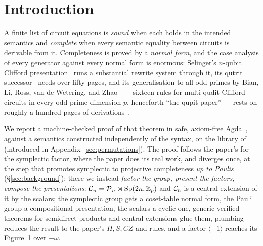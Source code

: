 \section{Introduction}\label{sec:intro}

A finite list of circuit equations is \emph{sound} when each holds in
the intended semantics and \emph{complete} when every semantic equality
between circuits is derivable from it.  Completeness is proved by a
\emph{normal form}, and the case analysis of every generator against
every normal form is enormous:
Selinger's $n$-qubit Clifford presentation~\cite{selinger2015clifford}
runs a substantial rewrite system through it, its qutrit
successor~\cite{li2025qutrit} needs over fifty pages, and its
generalisation to all odd primes by Bian, Li, Ross, van de Wetering, and
Zhao~\cite{bian2026qudit} --- sixteen rules for multi-qudit Clifford
circuits in every odd prime dimension $p$, henceforth ``the qupit
paper'' --- rests on roughly a hundred pages of
derivations~\cite{bian2026supplement}.

We report a machine-checked proof of that theorem in safe, axiom-free
Agda~\cite{norell2007thesis,agdastdlib}, against a semantics constructed
independently of the syntax, on the library of~\cite{bian2026framework,qupit-code} (introduced in Appendix~\ref{sec:permutations}).  The
proof follows the paper's for the symplectic factor, where the paper
does its real work, and diverges once, at the step that promotes
symplectic to projective completeness \emph{up to Paulis}
(\S\ref{sec:background}); there we instead \emph{factor the group,
present the factors, compose the presentations}: $\overline{\mathcal{C}}_{n} = \overline{\mathcal{P}}_{n}
\rtimes \mathrm{Sp}(2n,\mathbb{Z}_p)$ and $\mathcal{C}_{n}$ is a central extension of it by the scalars;
the symplectic group gets a coset-table normal form, the Pauli group a
compositional presentation, the scalars a cyclic one, generic verified
theorems for semidirect products and central extensions glue them,
plumbing reduces the result to the paper's $H, S, CZ$ and rules, and a
factor $\langle -1\rangle$ reaches its Figure~1 over $-\omega$.
